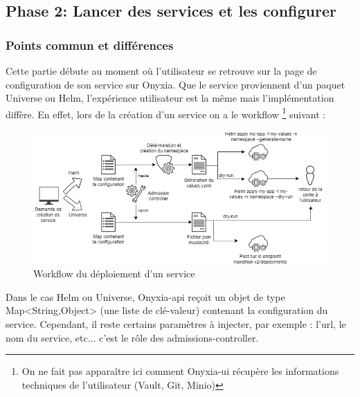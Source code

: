 \documentclass[11pt,fleqn]{book} %
\begin{document}
\subsection{Phase 2: Lancer des services et les configurer}
\subsubsection{Points commun et différences}
Cette partie débute au moment où l'utilisateur se retrouve sur la page de configuration de son service sur Onyxia. Que le service proviennent d'un paquet Universe ou Helm, l'expérience utilisateur est la même mais l'implémentation diffère. En effet, lors de la création d'un service on a le workflow \footnote{On ne fait pas apparaître ici comment Onyxia-ui récupère les informations techniques de l'utilisateur (Vault, Git, Minio)} suivant : 
\begin{figure}[H]\centering
\renewcommand{\figurename}{Diagramme}
\includegraphics[scale=0.6]{Pictures/onyxia/publish-service.png}
\captionsetup{margin=1.5cm,format=hang,justification=justified}
\caption{Workflow du déploiement d'un service \newline}
\end{figure}
Dans le cas Helm ou Universe, Onyxia-api reçoit un objet de type Map<String,Object> (une liste de clé-valeur) contenant la configuration du service. Cependant, il reste certains paramètres à injecter, par exemple : l'url, le nom du service, etc... c'est le rôle des admissions-controller.\\
\end{document}
